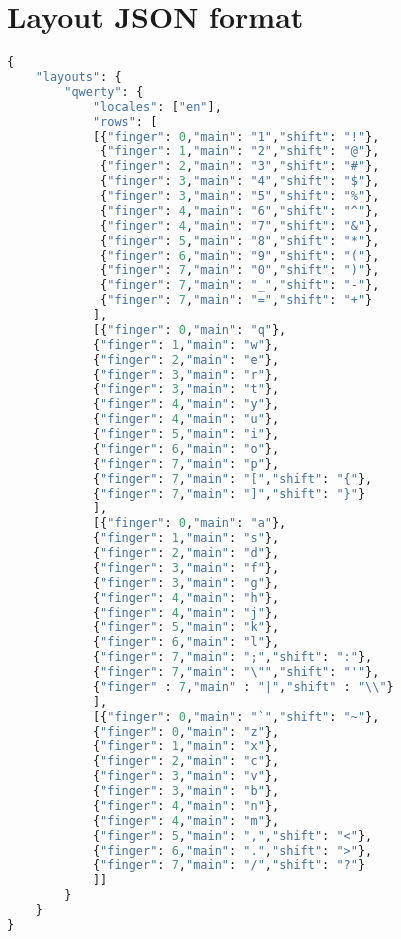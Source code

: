
\chapter{Layout JSON format}

\begin{lstlisting}[language=Python]
{
	"layouts": {
		"qwerty": {
			"locales": ["en"],
			"rows": [
			[{"finger": 0,"main": "1","shift": "!"},
			 {"finger": 1,"main": "2","shift": "@"},
			 {"finger": 2,"main": "3","shift": "#"},
			 {"finger": 3,"main": "4","shift": "$"},
			 {"finger": 3,"main": "5","shift": "%"},
			 {"finger": 4,"main": "6","shift": "^"},
			 {"finger": 4,"main": "7","shift": "&"},
			 {"finger": 5,"main": "8","shift": "*"},
			 {"finger": 6,"main": "9","shift": "("},
			 {"finger": 7,"main": "0","shift": ")"},
			 {"finger": 7,"main": "_","shift": "-"},
			 {"finger": 7,"main": "=","shift": "+"}
			],
			[{"finger": 0,"main": "q"},
			{"finger": 1,"main": "w"},
			{"finger": 2,"main": "e"},
			{"finger": 3,"main": "r"},
			{"finger": 3,"main": "t"},
			{"finger": 4,"main": "y"},
			{"finger": 4,"main": "u"},
			{"finger": 5,"main": "i"},
			{"finger": 6,"main": "o"},
			{"finger": 7,"main": "p"},
			{"finger": 7,"main": "[","shift": "{"},
			{"finger": 7,"main": "]","shift": "}"}
			],
			[{"finger": 0,"main": "a"},
			{"finger": 1,"main": "s"},
			{"finger": 2,"main": "d"},
			{"finger": 3,"main": "f"},
			{"finger": 3,"main": "g"},
			{"finger": 4,"main": "h"},
			{"finger": 4,"main": "j"},
			{"finger": 5,"main": "k"},
			{"finger": 6,"main": "l"},
			{"finger": 7,"main": ";","shift": ":"},
			{"finger": 7,"main": "\"","shift": "'"},
			{"finger" : 7,"main" : "|","shift" : "\\"}
			],
			[{"finger": 0,"main": "`","shift": "~"},
			{"finger": 0,"main": "z"},
			{"finger": 1,"main": "x"},
			{"finger": 2,"main": "c"},
			{"finger": 3,"main": "v"},
			{"finger": 3,"main": "b"},
			{"finger": 4,"main": "n"},
			{"finger": 4,"main": "m"},
			{"finger": 5,"main": ",","shift": "<"},
			{"finger": 6,"main": ".","shift": ">"},
			{"finger": 7,"main": "/","shift": "?"}
			]]
		}
	}
}
\end{lstlisting}

